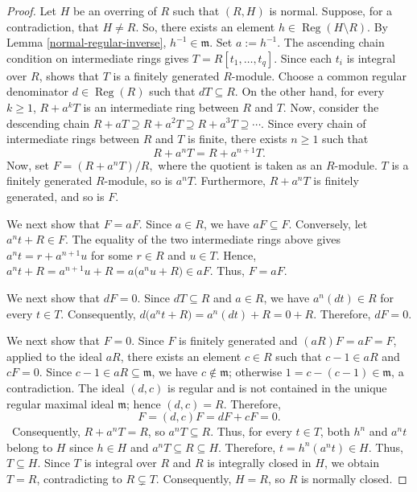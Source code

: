 \documentclass[12pt]{article}
\newcommand{\Reg}{\operatorname{Reg}}
\begin{document}
	\begin{proof}		
		Let $H$ be an overring of $R$ such that $(R,H)$ is normal. Suppose, for a contradiction, that $H\neq R$. So, there exists an element $h\in\Reg(H\setminus R)$. By Lemma \ref{normal-regular-inverse}, $h^{-1}\in\mathfrak{m}.$ Set $a:=h^{-1}$. The ascending chain condition on intermediate rings gives $T=R[t_1,\ldots,t_q]$. Since each $t_i$ is integral over $R$, \cite[Corollary 5.2]{atiyah} shows that $T$ is a finitely generated $R$-module. Choose a common regular denominator $d\in\Reg(R)$ such that $dT\subseteq R$. On the other hand, for every $k\geq 1$, $R+a^kT$ is an intermediate ring between $R$ and $T$. Now, consider the descending chain $R+aT\supseteq R+a^2T \supseteq R+a^3T\supseteq\cdots.$ Since every chain of intermediate rings between $R$ and $T$ is finite, there exists $n\geq 1$ such that
		\[
		R+a^nT=R+a^{n+1}T.
		\]
		Now, set $F=(R+a^nT)/R,$ where the quotient is taken as an $R$-module. $T$ is a finitely generated $R$-module, so is $a^nT$. Furthermore, $R+a^nT$ is finitely generated, and so is $F$.
		
		We next show that $F=aF$. Since $a\in R$, we have $aF\subseteq F$. Conversely, let $a^nt+R\in F$. The equality of the two intermediate rings above gives $a^nt=r+a^{n+1}u $ for some $r\in R$ and $u\in T$. Hence, $a^nt+R=a^{n+1}u+R =a\bigl(a^nu+R\bigr)\in aF. $ Thus, $F=aF$.
		
		We next show that $dF=0$. Since $dT\subseteq R$ and $a\in R$, we have $a^n(dt)\in R$ for every $t\in T$. Consequently, $d\bigl(a^nt+R\bigr) =a^n(dt)+R=0+R.$ Therefore, $dF=0$.
		
		We next show that $F=0.$ Since $F$ is finitely generated and $(aR)F=aF=F$, \cite[Corollary 2.5]{atiyah} applied to the ideal $aR$, there exists an element $c\in R$ such that $c-1\in aR$ and $cF=0$. Since $c-1\in aR\subseteq\mathfrak{m}$, we have $c\notin\mathfrak{m}$; otherwise $1=c-(c-1)\in\mathfrak{m}$, a contradiction. The ideal $(d,c)$ is regular and is not contained in the unique regular maximal ideal $\mathfrak{m}$; hence $(d,c)=R$. Therefore, $$F=(d,c)F=dF+cF=0.$$ Consequently, $R+a^nT=R$, so $a^nT\subseteq R$. Thus, for every $t\in T$, both $h^n$ and $a^nt$ belong to $H$ since $h\in H$ and $a^nT\subseteq R\subseteq H$. Therefore, $t=h^n(a^nt)\in H. $ Thus, $T\subseteq H$. Since $T$ is integral over $R$ and $R$ is integrally closed in $H$, we obtain $T=R$, contradicting to $R\subsetneq T$. Consequently, $H=R$, so $R$ is normally closed.
	\end{proof}
	
\end{document}
